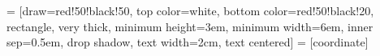 %
%
%
%

\setcounter{secnumdepth}{3}
\setcounter{tocdepth}{3}

\usepackage[T1]{fontenc}
\usepackage[latin9]{inputenc}

\usepackage{babel}
\usepackage{array}
\usepackage{float}
\usepackage{graphicx}
\usepackage{nomencl}
\usepackage{fancyhdr}
\usepackage{tikz}
\usepackage{lastpage}

\pagestyle{fancy}


\fancyfoot[RE,RO]{
  \footnotesize{
    \jobname\\
    \today
  }
}

\usetikzlibrary{shapes,arrows,shadows,calc}
   = [draw=red!50!black!50, %
                       top color=white,
                       bottom color=red!50!black!20,
                       rectangle,
                       very thick,
                       minimum height=3em,
                       minimum width=6em,
                       inner sep=0.5em,
                       drop shadow,
                       text width=2cm,
                       text centered]
   = [coordinate]
 